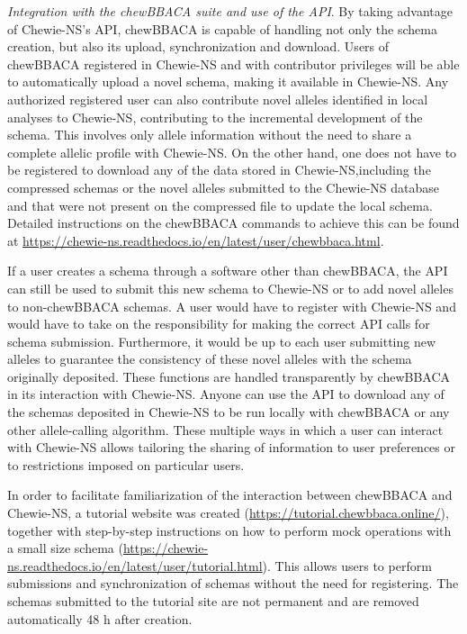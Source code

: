 \textit{Integration with the chewBBACA suite and use of the API}. By taking advantage of \ac{Chewie-NS}’s \ac{API}, chewBBACA is capable of handling not only the schema creation, but also its upload, synchronization and download. Users of chewBBACA registered in \ac{Chewie-NS} and with contributor privileges will be able to automatically upload a novel schema, making it available in \ac{Chewie-NS}. Any authorized registered user can also contribute novel alleles identified in local analyses to \ac{Chewie-NS}, contributing to the incremental development of the schema. This involves only allele information without the need to share a complete allelic profile with \ac{Chewie-NS}. On the other hand, one does not have to be registered to download any of the data stored in \ac{Chewie-NS},including the compressed schemas or the novel alleles submitted to the \ac{Chewie-NS} database and that were not present on the compressed file to update the local schema. Detailed instructions on the chewBBACA commands to achieve this can be found at \url{https://chewie-ns.readthedocs.io/en/latest/user/chewbbaca.html}.

If a user creates a schema through a software other than chewBBACA, the \ac{API} can still be used to submit this new schema to \ac{Chewie-NS} or to add novel alleles to non-chewBBACA schemas. A user would have to register with \ac{Chewie-NS} and would have to take on the responsibility for making the correct \ac{API} calls for schema submission. Furthermore, it would be up to each user submitting new alleles to guarantee the consistency of these novel alleles with the schema originally deposited. These functions are handled transparently by chewBBACA in its interaction with \ac{Chewie-NS}. Anyone can use the \ac{API} to download any of the schemas deposited in \ac{Chewie-NS} to be run locally with chewBBACA or any other allele-calling algorithm. These multiple ways in which a user can interact with \ac{Chewie-NS} allows tailoring the sharing of information to user preferences or to restrictions imposed on particular users.

In order to facilitate familiarization of the interaction between chewBBACA and \ac{Chewie-NS}, a tutorial website was created (\url{https://tutorial.chewbbaca.online/}), together with step-by-step instructions on how to perform mock operations with a small size schema (\url{https://chewie-ns.readthedocs.io/en/latest/user/tutorial.html}). This allows users to perform submissions and synchronization of schemas without the need for registering. The schemas submitted to the tutorial site are not permanent and are removed automatically 48 h after creation.

